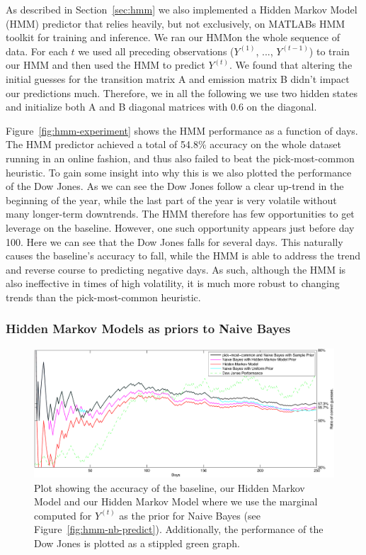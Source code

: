 \documentclass[10pt, twocolumn]{article}
\begin{document}
As described in Section~\ref{sec:hmm} we also implemented a Hidden Markov Model (HMM) predictor that relies heavily, but not exclusively, on MATLABs HMM toolkit for training and inference.
We ran our HMMon the whole sequence of data. For each $t$ we used all preceding observations ($Y^{(1)}$, ..., $Y^{(t-1)}$) to train our HMM and then used the HMM to predict $Y^{(t)}$.
We found that altering the initial guesses for the transition matrix A and emission matrix B didn't impact our predictions much.
Therefore, we in all the following we use two hidden states and initialize both A and B diagonal matrices with 0.6 on the diagonal.

Figure~\ref{fig:hmm-experiment} shows the HMM performance as a function of days.
The HMM predictor achieved a total of 54.8\% accuracy on the whole dataset running in an online fashion, and thus also failed to beat the pick-most-common heuristic.
To gain some insight into why this is we also plotted the performance of the Dow Jones.
As we can see the Dow Jones follow a clear up-trend in the beginning of the year, while the last part of the year is very volatile without many longer-term downtrends.
The HMM therefore has few opportunities to get leverage on the baseline.
However, one such opportunity appears just before day 100. Here we can see that the Dow Jones falls for several days. This naturally causes the baseline's accuracy to fall, while the HMM is able to address the trend and reverse course to predicting negative days.
As such, although the HMM is also ineffective in times of high volatility, it is much more robust to changing trends than the pick-most-common heuristic.

\subsubsection{Hidden Markov Models as priors to Naive Bayes}

\begin{figure}
\center
\hspace{0.5cm}
\includegraphics[width=16cm]{experiments/hmm_nb.pdf}
\caption{Plot showing the accuracy of the baseline, our Hidden Markov Model and our Hidden Markov Model where we use the marginal computed for $Y^{(t)}$ as the prior for Naive Bayes (see Figure~\ref{fig:hmm-nb-predict}). Additionally, the performance of the Dow Jones is plotted as a stippled green graph.}
\label{fig:hmm-nb-experiment}
\end{figure}
\end{document}
